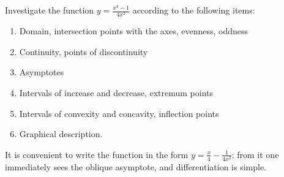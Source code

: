 
\begin{question}
Investigate the function $y=\frac{x^3-1}{4x^2}$ according to the following items:
\begin{enumerate}
  \item Domain, intersection points with the axes, evenness, oddness
  \item Continuity, points of discontinuity
  \item Asymptotes
  \item Intervals of increase and decrease, extremum points
  \item Intervals of convexity and concavity, inflection points
  \item Graphical description.
\end{enumerate}
\end{question}

\begin{hint}
It is convenient to write the function in the form $y=\frac{x}{4}-\frac{1}{4x^2}$: from it one immediately sees the oblique asymptote, and differentiation is simple.
\end{hint}

